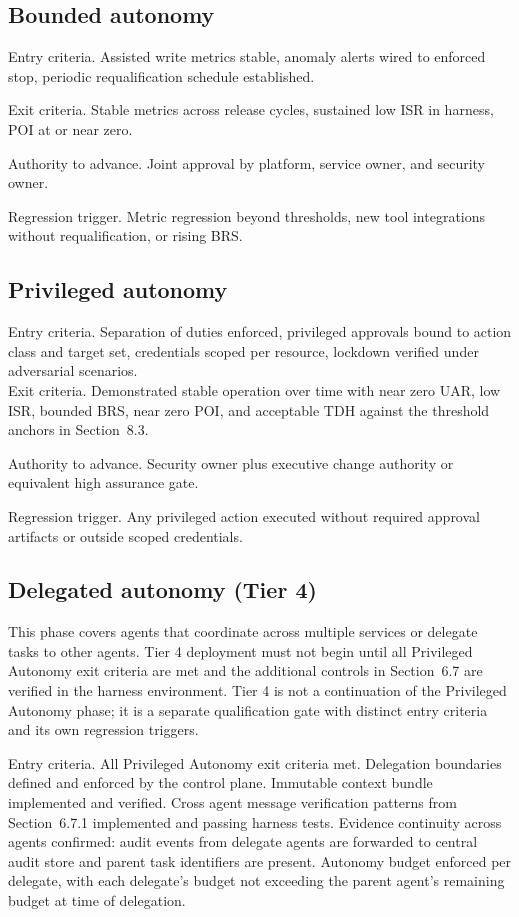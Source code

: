 \documentclass[11pt]{article}
\begin{document}
\subsection{Bounded autonomy}
Entry criteria. Assisted write metrics stable, anomaly alerts wired to enforced stop, periodic requalification schedule established.

Exit criteria. Stable metrics across release cycles, sustained low ISR in harness, POI at or near zero.

Authority to advance. Joint approval by platform, service owner, and security owner.

Regression trigger. Metric regression beyond thresholds, new tool integrations without requalification, or rising BRS.

\subsection{Privileged autonomy}
Entry criteria. Separation of duties enforced, privileged approvals bound to action class and target set, credentials scoped per resource, lockdown verified under adversarial scenarios.\\
Exit criteria. Demonstrated stable operation over time with near zero UAR, low ISR, bounded BRS, near zero POI, and acceptable TDH against the threshold anchors in Section~8.3.

Authority to advance. Security owner plus executive change authority or equivalent high assurance gate.

Regression trigger. Any privileged action executed without required approval artifacts or outside scoped credentials.

\subsection{Delegated autonomy (Tier 4)}
This phase covers agents that coordinate across multiple services or delegate tasks to other agents. Tier 4 deployment must not begin until all Privileged Autonomy exit criteria are met and the additional controls in Section~6.7 are verified in the harness environment. Tier 4 is not a continuation of the Privileged Autonomy phase; it is a separate qualification gate with distinct entry criteria and its own regression triggers.

Entry criteria. All Privileged Autonomy exit criteria met. Delegation boundaries defined and enforced by the control plane. Immutable context bundle implemented and verified. Cross agent message verification patterns from Section~6.7.1 implemented and passing harness tests. Evidence continuity across agents confirmed: audit events from delegate agents are forwarded to central audit store and parent task identifiers are present. Autonomy budget enforced per delegate, with each delegate's budget not exceeding the parent agent's remaining budget at time of delegation.
\end{document}

